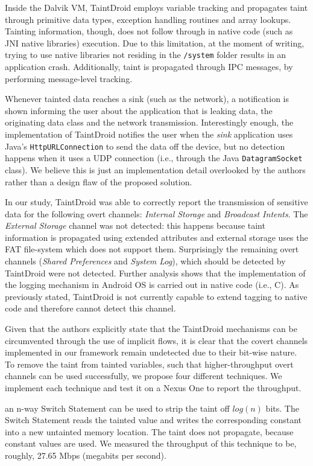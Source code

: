 Inside the Dalvik VM, TaintDroid employs variable tracking and
propagates taint through primitive data types, exception handling
routines and array lookups. Tainting information, though, does not
follow through in native code (such as JNI native libraries)
execution. Due to this limitation, at the moment of writing, trying to
use native libraries not residing in the \texttt{/system} folder
results in an application crash. Additionally, taint is propagated
through IPC messages, by performing message-level tracking.

Whenever tainted data reaches a sink (such as the network), a
notification is shown informing the user about the application that is
leaking data, the originating data class and the network
transmission. Interestingly enough, the implementation of TaintDroid
notifies the user when the \emph{sink} application uses Java's
\texttt{HttpURLConnection} to send the data off the device, but no
detection happens when it uses a UDP connection (i.e., through the
Java \texttt{DatagramSocket} class). We believe this is just an
implementation detail overlooked by the authors rather than a design
flaw of the proposed solution.

In our study, TaintDroid was able to correctly report the transmission
of sensitive data for the following overt channels: \emph{Internal
  Storage} and \emph{Broadcast Intents}. The \emph{External Storage}
channel was not detected: this happens because taint information is
propagated using extended attributes and external storage uses the FAT
file-system which does not support them. Surprisingly the remaining
overt channels (\emph{Shared Preferences} and \emph{System Log}),
which should be detected by TaintDroid were not detected. Further
analysis shows that the implementation of the logging mechanism in
Android OS is carried out in native code (i.e., C). As previously
stated, TaintDroid is not currently capable to extend tagging to
native code and therefore cannot detect this channel.

Given that the authors explicitly state that the TaintDroid mechanisms
can be circumvented through the use of implicit flows, it is clear
that the covert channels implemented in our framework remain
undetected due to their bit-wise nature. To remove the taint from
tainted variables, such that higher-throughput overt channels can be
used successfully, we propose four different techniques. We implement
each technique and test it on a Nexus One to report the throughput.

 an n-way
Switch Statement can be used to strip the taint off $log(n)$ bits. The
Switch Statement reads the tainted value and writes the corresponding
constant into a new untainted memory location. The taint does not
propagate, because constant values are used. We measured the
throughput of this technique to be, roughly, 27.65 Mbps (megabits per
second).

